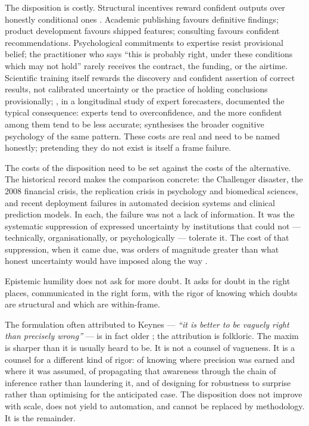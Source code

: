 \documentclass[11pt,a4paper]{article}
\begin{document}
The disposition is costly. Structural incentives reward confident
outputs over honestly conditional ones
\citep{IoannidisPLoS2005,NosekOSC2015}. Academic publishing favours
definitive findings; product development favours shipped features;
consulting favours confident recommendations. Psychological commitments
to expertise resist provisional belief; the practitioner who says ``this
is probably right, under these conditions which may not hold'' rarely
receives the contract, the funding, or the airtime. Scientific training itself
rewards the discovery and confident assertion of correct results, not
calibrated uncertainty or the practice of holding conclusions
provisionally; \citet{Tetlock2005}, in a longitudinal study of expert
forecasters, documented the typical consequence: experts tend to
overconfidence, and the more confident among them tend to be less
accurate; \citet{Kahneman2011} synthesises the broader cognitive
psychology of the same pattern. These costs are real and need to be
named honestly;
pretending they do not exist is itself a frame failure.

The costs of the disposition need to be set against the costs of the
alternative. The historical record makes the comparison concrete: the
Challenger disaster, the 2008 financial crisis, the replication crisis
in psychology and biomedical sciences, and recent deployment failures in
automated decision systems and clinical prediction models. In each, the
failure was not a lack of information. It was the systematic suppression
of expressed uncertainty by institutions that could not --- technically,
organisationally, or psychologically --- tolerate it. The cost of that
suppression, when it came due, was orders of magnitude greater than what
honest uncertainty would have imposed along the way
\citep{Vaughan1996,IoannidisPLoS2005,KingKay2020}.

Epistemic humility does not ask for more doubt. It asks for doubt in the
right places, communicated in the right form, with the rigor of knowing
which doubts are structural and which are within-frame.

The formulation often attributed to Keynes --- \emph{``it is better to
be vaguely right than precisely wrong''} --- is in fact older
\citep{Read1898}; the attribution is folkloric. The maxim is sharper
than it is usually heard to be. It is not a counsel of vagueness. It is
a counsel for a different kind of rigor: of knowing where precision was
earned and where it was assumed, of propagating that awareness through
the chain of inference rather than laundering it, and of designing for
robustness to surprise rather than optimising for the anticipated case.
The disposition does not improve with scale, does not yield to
automation, and cannot be replaced by methodology. It is the remainder.
\end{document}
